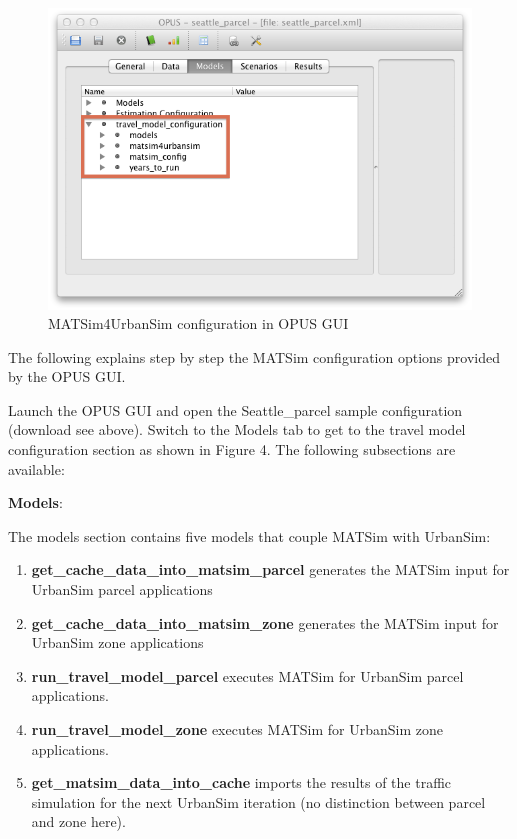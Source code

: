 \begin{figure}[htp]
\includegraphics[width=\textwidth]{figures/matsim4urbansim/gui.png}
\caption{MATSim4UrbanSim configuration in OPUS GUI}
\end{figure}

The following explains step by step the MATSim configuration options provided by the OPUS GUI.

Launch the OPUS GUI and open the Seattle\_parcel sample configuration  (download see above). Switch to the Models tab to get to the travel  model configuration section as shown in Figure 4. The following  subsections are available:

\textbf{Models}:

The models section contains five models that couple MATSim with UrbanSim:
\begin{enumerate}
	\item \textbf{get\_cache\_data\_into\_matsim\_parcel} generates the MATSim input for UrbanSim parcel applications
	\item \textbf{get\_cache\_data\_into\_matsim\_zone} generates the MATSim input for UrbanSim zone applications
	\item \textbf{run\_travel\_model\_parcel }executes MATSim for UrbanSim parcel applications.
	\item \textbf{run\_travel\_model\_zone} executes MATSim for UrbanSim zone applications.
	\item \textbf{get\_matsim\_data\_into\_cache} imports the results of the traffic simulation for the next UrbanSim iteration (no distinction between parcel and zone here).
\end{enumerate}

